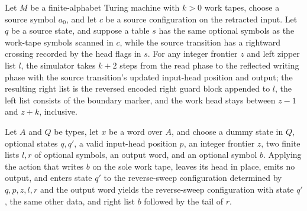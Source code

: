 \begin{lemma}
\label{Turing.FinTM.dg_turn_with_growth}
\leanok
{}
Let $M$ be a finite-alphabet Turing machine with $k>0$ work tapes, choose a source
symbol $a_0$, and let $c$ be a source configuration on the retracted input. Let $q$ be a
source state, and suppose a table $s$ has the same optional symbols as the work-tape
symbols scanned in $c$, while the source transition has a rightward crossing recorded by
the head flags in $s$. For any integer frontier $z$ and left zipper list $l$, the
simulator takes $k+2$ steps from the read phase to the reflected writing phase with the
source transition's updated input-head position and output; the resulting right list is
the reversed encoded right guard block appended to $l$, the left list consists of the
boundary marker, and the work head stays between $z-1$ and $z+k$, inclusive.
\end{lemma}

\begin{lemma}
\label{Turing.FinTM.dgRev_write_optional}
\leanok
{}
Let $A$ and $Q$ be types, let $x$ be a word over $A$, and choose a dummy state in $Q$,
optional states $q,q'$, a valid input-head position $p$, an integer frontier $z$, two
finite lists $l,r$ of optional symbols, an output word, and an optional symbol $b$.
Applying the action that writes $b$ on the sole work tape, leaves its head in place,
emits no output, and enters state $q'$ to the reverse-sweep configuration determined by
$q,p,z,l,r$ and the output word yields the reverse-sweep configuration with state $q'$,
the same other data, and right list $b$ followed by the tail of $r$.
\end{lemma}

